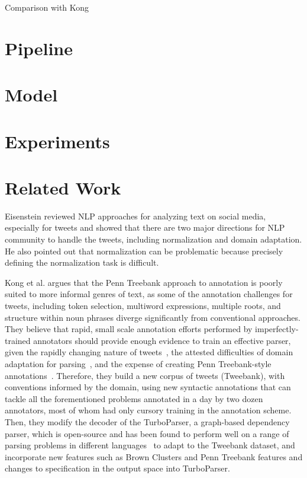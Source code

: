 \documentclass[11pt,letterpaper]{article}
\begin{document}
Comparison with Kong


\section{Pipeline}

\section{Model}

\section{Experiments}


\section{Related Work}
Eisenstein  reviewed NLP approaches for analyzing text on social media, especially for tweets and showed that there are two major directions for NLP community to handle the tweets, including normalization and domain adaptation. He also pointed out that normalization can be problematic because precisely defining the normalization task is difficult. 

Kong et al.  argues that the Penn Treebank approach to annotation is poorly suited to more informal genres of text, as some of the annotation challenges for tweets,
including token selection, multiword expressions, multiple roots, and structure within noun phrases diverge significantly from conventional approaches. 
They believe that rapid, small scale annotation efforts performed by imperfectly-trained annotators should provide enough evidence to train an effective parser, given the rapidly changing nature of tweets~\cite{eisenstein:2013:NAACL-HLT}, the attested difficulties of domain adaptation for parsing~\cite{dred07}, and the expense of creating Penn Treebank-style annotations~\cite{penn93}. 
Therefore, they build a new corpus of tweets (Tweebank), with conventions informed by the domain, using new syntactic annotations that can tackle all the forementioned problems annotated in a day by two dozen annotators, most of whom had only cursory training in the annotation scheme. Then, they modify the decoder of the TurboParser, a graph-based dependency parser, which is open-source and has been found to perform well on a range of parsing problems in different languages~\cite{turbo13} to adapt to the Tweebank dataset, and incorporate new features such as Brown Clusters and Penn Treebank features and changes to specification
in the output space into TurboParser.
\end{document}
